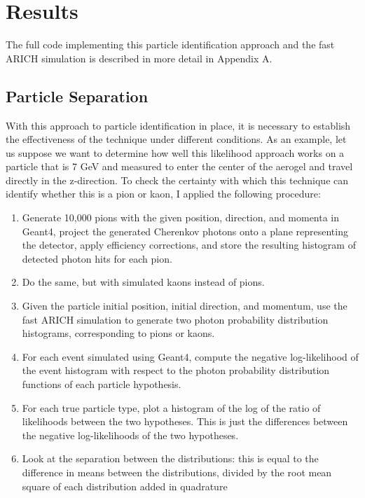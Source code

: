 
\chapter{Results}
\label{ch:Results}


The full code implementing this particle identification approach and the fast ARICH simulation is described in more detail in Appendix A.

\section{Particle Separation}
With this approach to particle identification in place, it is necessary to establish the effectiveness of the technique under different conditions.
As an example, let us suppose we want to determine how well this likelihood approach works on a particle that is 7 GeV and measured to enter the center of the aerogel and travel directly in the z-direction.
To check the certainty with which this technique can identify whether this is a pion or kaon, I applied the following procedure:

\begin{enumerate}
\item Generate 10,000 pions with the given position, direction, and momenta in Geant4, project the generated Cherenkov photons onto a plane representing the detector, apply efficiency corrections, and store the resulting histogram of detected photon hits for each pion. 
\item Do the same, but with simulated kaons instead of pions.
\item Given the particle initial position, initial direction, and momentum, use the fast ARICH simulation to generate two photon probability distribution histograms, corresponding to pions or kaons.
\item For each event simulated using Geant4, compute the negative log-likelihood of the event histogram with respect to the photon probability distribution functions of each particle hypothesis.
\item For each true particle type, plot a histogram of the log of the ratio of likelihoods between the two hypotheses.
This is just the differences between the negative log-likelihoods of the two hypotheses.
\item Look at the separation between the distributions: this is equal to the difference in means between the distributions, divided by the root mean square of each distribution added in quadrature
\end{enumerate}

